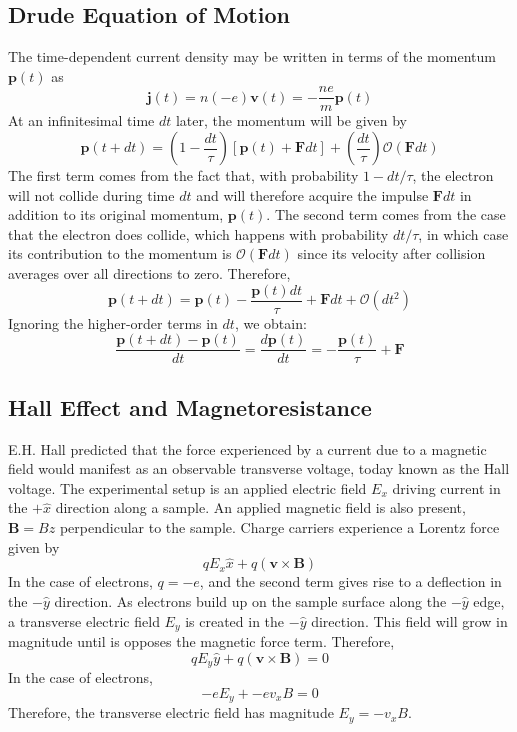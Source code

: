 \documentclass[10pt]{article}
\begin{document}
\subsection{Drude Equation of Motion}
The time-dependent current density may be written in terms of the momentum $\textbf{p}(t)$ as
$$\textbf{j}(t) = n(-e)\textbf{v}(t) = -\frac{ne}{m}\textbf{p}(t)$$
At an infinitesimal time $dt$ later, the momentum will be given by
$$\textbf{p}(t + dt) = \left ( 1 - \frac{dt}{\tau}\right ) \left [ \textbf{p}(t) + \textbf{F}dt\right ] + \left ( \frac{dt}{\tau}\right )\mathcal{O}(\textbf{F}dt)$$
The first term comes from the fact that, with probability $1-dt/\tau$, the electron will not collide during time $dt$ and will therefore acquire the impulse $\textbf{F}dt$
in addition to its original momentum, $\textbf{p}(t)$. The second term comes from the case that the electron does collide, which happens with probability $dt/\tau$, in
which case its contribution to the momentum is $\mathcal{O}(\textbf{F}dt)$ since its velocity after collision averages over all directions to zero.
Therefore,
$$\textbf{p}(t + dt) = \textbf{p}(t) - \frac{\textbf{p}(t)dt}{\tau} + \textbf{F}dt + \mathcal{O}(dt^{2})$$
Ignoring the higher-order terms in $dt$, we obtain:
$$\frac{\textbf{p}(t + dt) - \textbf{p}(t)}{dt} = \frac{d\textbf{p}(t)}{dt} =  - \frac{\textbf{p}(t)}{\tau} + \textbf{F}$$

\subsection{Hall Effect and Magnetoresistance}
E.H. Hall predicted that the force experienced by a current due to a magnetic field would manifest as an observable transverse voltage, today known
as the Hall voltage.
The experimental setup is an applied electric field $E_{x}$ driving current in the $+\hat{x}$ direction along a sample. An applied magnetic field
is also present, $\textbf{B} = B\hat{z}$ perpendicular to the sample. Charge carriers experience a Lorentz force given by
$$qE_{x}\hat{x} + q(\textbf{v}\times\textbf{B})$$
In the case of electrons, $q = -e$, and the second term gives rise to a deflection in the $-\hat{y}$ direction. As electrons build up on the sample
surface along the $-\hat{y}$ edge, a transverse electric field $E_{y}$ is created in the $-\hat{y}$ direction. This field will grow in magnitude until is opposes
the magnetic force term. Therefore,
$$qE_{y}\hat{y} + q(\textbf{v}\times\textbf{B}) = 0$$
In the case of electrons,
$$-eE_{y} + -ev_{x}B = 0$$
Therefore, the transverse electric field has magnitude $E_{y} = -v_{x}B$.
\end{document}
